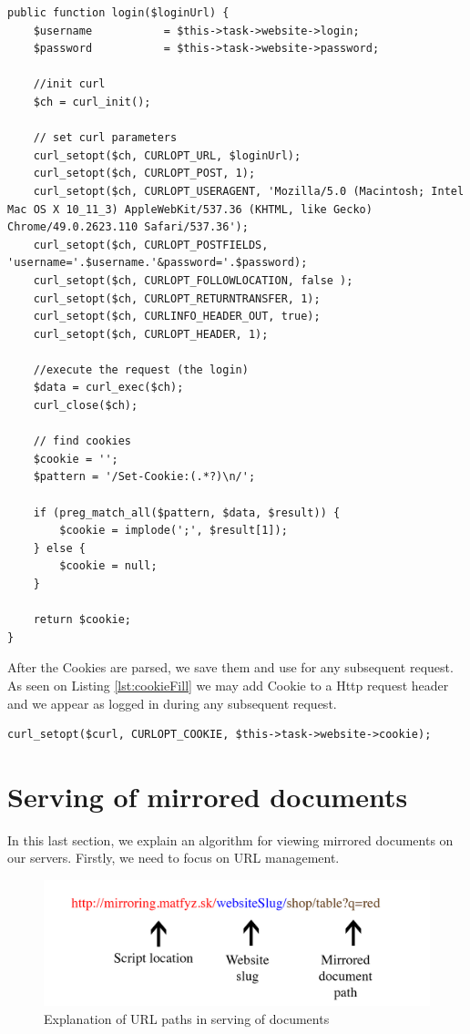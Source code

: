 \begin{lstlisting}[caption={Retrieving of a Cookie with Curl library},label={lst:login}]
public function login($loginUrl) {
    $username           = $this->task->website->login;
    $password           = $this->task->website->password;

    //init curl
    $ch = curl_init();
	
	// set curl parameters
    curl_setopt($ch, CURLOPT_URL, $loginUrl);
    curl_setopt($ch, CURLOPT_POST, 1);
    curl_setopt($ch, CURLOPT_USERAGENT, 'Mozilla/5.0 (Macintosh; Intel Mac OS X 10_11_3) AppleWebKit/537.36 (KHTML, like Gecko) Chrome/49.0.2623.110 Safari/537.36');
    curl_setopt($ch, CURLOPT_POSTFIELDS, 'username='.$username.'&password='.$password);
    curl_setopt($ch, CURLOPT_FOLLOWLOCATION, false );
    curl_setopt($ch, CURLOPT_RETURNTRANSFER, 1);
    curl_setopt($ch, CURLINFO_HEADER_OUT, true);
    curl_setopt($ch, CURLOPT_HEADER, 1);

    //execute the request (the login)
    $data = curl_exec($ch);
    curl_close($ch);

    // find cookies
    $cookie = '';
    $pattern = '/Set-Cookie:(.*?)\n/';

    if (preg_match_all($pattern, $data, $result)) {
        $cookie = implode(';', $result[1]);
    } else {
        $cookie = null;
    }

    return $cookie;
}
\end{lstlisting}

After the Cookies are parsed, we save them and use for any subsequent request. As seen on Listing \ref{lst:cookieFill} we may add Cookie to a Http request header and we appear as logged in during any subsequent request.

\begin{lstlisting}[caption={Adding Cookie to HTTP header using Curl},label={lst:cookieFill}]
curl_setopt($curl, CURLOPT_COOKIE, $this->task->website->cookie);
\end{lstlisting}

\section{Serving of mirrored documents}
\label{sec:serving}
In this last section, we explain an algorithm for viewing mirrored documents on our servers. Firstly, we need to focus on URL management.

\begin{figure}[h]
    \centering
    \includegraphics[width=\textwidth]{images/urls.png}
    \caption{Explanation of URL paths in serving of documents}
    \label{fig:urls}
\end{figure}

